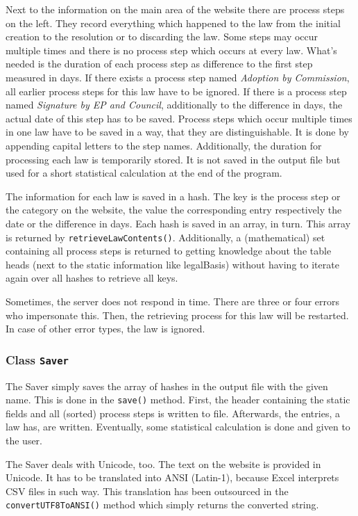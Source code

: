 \documentclass{scrartcl}
\begin{document}
Next to the information on the main area of the website there are process steps on the left. They record everything which happened to the law from the initial creation to the resolution or to discarding the law. Some steps may occur multiple times and there is no process step which occurs at every law. What's needed is the duration of each process step as difference to the first step measured in days. If there exists a process step named \textit{Adoption by Commission}, all earlier process steps for this law have to be ignored. If there is a process step named \textit{Signature by EP and Council}, additionally to the difference in days, the actual date of this step has to be saved. Process steps which occur multiple times in one law have to be saved in a way, that they are distinguishable. It is done by appending capital letters to the step names. Additionally, the duration for processing each law is temporarily stored. It is not saved in the output file but used for a short statistical calculation at the end of the program.

The information for each law is saved in a hash. The key is the process step or the category on the website, the value the corresponding entry respectively the date or the difference in days. Each hash is saved in an array, in turn. This array is returned by \texttt{retrieveLawContents()}. Additionally, a (mathematical) set containing all process steps is returned to getting knowledge about the table heads (next to the static information like legalBasis) without having to iterate again over all hashes to retrieve all keys.

Sometimes, the server does not respond in time. There are three or four errors who impersonate this. Then, the retrieving process for this law will be restarted. In case of other error types, the law is ignored.



\subsubsection{Class \texttt{Saver}}
The Saver simply saves the array of hashes in the output file with the given name. This is done in the \texttt{save()} method. First, the header containing the static fields and all (sorted) process steps is written to file. Afterwards, the entries, a law has, are written. Eventually, some statistical calculation is done and given to the user.

The Saver deals with Unicode, too. The text on the website is provided in Unicode. It has to be translated into ANSI (Latin-1), because Excel interprets CSV files in such way. This translation has been outsourced in the \texttt{convertUTF8ToANSI()} method which simply returns the converted string.
\end{document}
